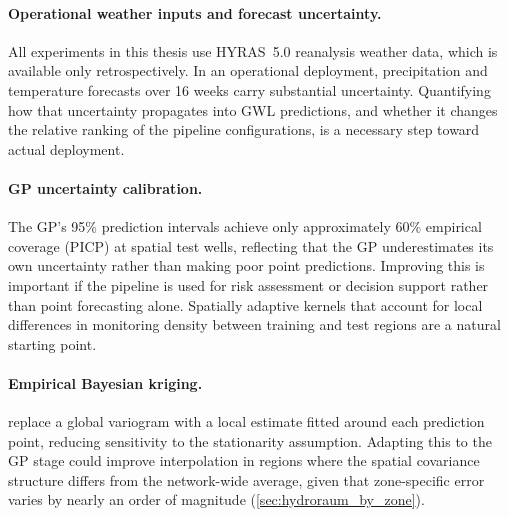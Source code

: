 \paragraph{Operational weather inputs and forecast uncertainty.}
All experiments in this thesis use HYRAS~5.0 reanalysis weather data, which is available only retrospectively. In an operational deployment, precipitation and temperature forecasts over 16 weeks carry substantial uncertainty. Quantifying how that uncertainty propagates into GWL predictions, and whether it changes the relative ranking of the pipeline configurations, is a necessary step toward actual deployment.

\paragraph{GP uncertainty calibration.}
The GP's 95\% prediction intervals achieve only approximately 60\% empirical coverage (PICP) at spatial test wells, reflecting that the GP underestimates its own uncertainty rather than making poor point predictions. Improving this is important if the pipeline is used for risk assessment or decision support rather than point forecasting alone. Spatially adaptive kernels that account for local differences in monitoring density between training and test regions are a natural starting point.

\paragraph{Empirical Bayesian kriging.}
\citet{zowam2024} replace a global variogram with a local estimate fitted around each prediction point, reducing sensitivity to the stationarity assumption. Adapting this to the GP stage could improve interpolation in regions where the spatial covariance structure differs from the network-wide average, given that zone-specific error varies by nearly an order of magnitude (\cref{sec:hydroraum_by_zone}).
